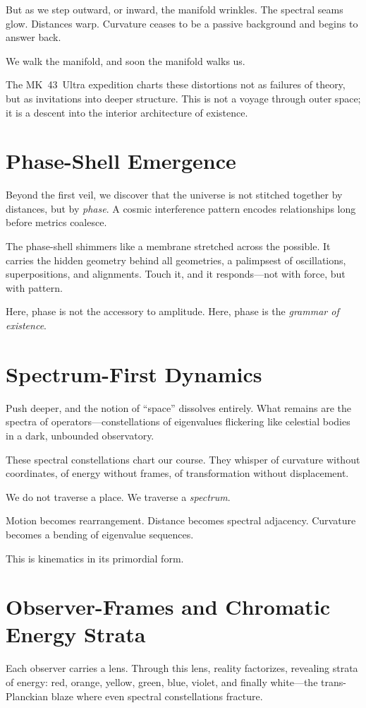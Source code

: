 But as we step outward, or inward, the manifold wrinkles.
The spectral seams glow.
Distances warp.
Curvature ceases to be a passive background and begins to answer back.

We walk the manifold, and soon the manifold walks us.

The MK~43~Ultra expedition charts these distortions not as failures of theory,
but as invitations into deeper structure. This is not a voyage through outer space;
it is a descent into the interior architecture of existence.

\section{Phase-Shell Emergence}
Beyond the first veil, we discover that the universe is not stitched together
by distances, but by \emph{phase}. A cosmic interference pattern encodes relationships
long before metrics coalesce.

The phase-shell shimmers like a membrane stretched across the possible.
It carries the hidden geometry behind all geometries, a palimpsest of oscillations,
superpositions, and alignments. Touch it, and it responds—not with force, but with pattern.

Here, phase is not the accessory to amplitude.
Here, phase is the \emph{grammar of existence}.

\section{Spectrum-First Dynamics}
Push deeper, and the notion of ``space'' dissolves entirely. What remains are the spectra
of operators—constellations of eigenvalues flickering like celestial bodies in a dark,
unbounded observatory.

These spectral constellations chart our course. They whisper of curvature without coordinates,
of energy without frames, of transformation without displacement.

We do not traverse a place.
We traverse a \emph{spectrum}.

Motion becomes rearrangement.
Distance becomes spectral adjacency.
Curvature becomes a bending of eigenvalue sequences.

This is kinematics in its primordial form.

\section{Observer-Frames and Chromatic Energy Strata}
Each observer carries a lens. Through this lens, reality factorizes, revealing strata of energy:
red, orange, yellow, green, blue, violet, and finally white—the trans-Planckian blaze
where even spectral constellations fracture.

